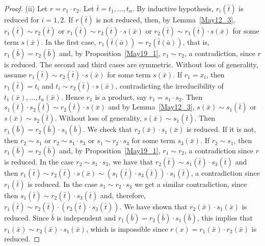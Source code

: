 \documentclass[a4paper, 11pt]{article}
\theoremstyle{note}
\begin{document}
\begin{proof}
	(ii) Let $r=r_1\cdot r_2$. Let $\bar{t}=t_1,\ldots,t_n$. By inductive hypothesis, $r_i(\bar{t})$ is reduced for $i=1,2$. If  $r(\bar{t})$ is not reduced, then,  by Lemma~\ref{May12_3}, $r_1(\bar{t})\sim r_2(\bar{t})$ or  $r_1(\bar{t})\sim r_2(\bar{t})\cdot s(\bar{x})$ or $r_2(\bar{t})\sim r_1(\bar{t})\cdot s(\bar{x})$  for some term $s(\bar{x})$. In the first case, $r_1(\bar{t}(\bar{a}))= r_2(\bar{t}(\bar{a}))$, that is, $r_1(\bar{b})= r_2(\bar{b})$ and, by Proposition~\ref{May19_1}, $r_1\sim r_2$, a contradiction, since $r$ is reduced. The second and third cases are symmetric. Without loss of generality, assume $r_1(\bar{t})\sim r_2(\bar{t})\cdot s(\bar{x})$ for some term $s(\bar{x})$. If $r_1=x_i$, then  $r_1(\bar{t})=t_i$  and $t_i\sim r_2(\bar{t})\cdot s(\bar{x})$, contradicting the irreducibility of $t_1(\bar{x}),\ldots,t_n(\bar{x})$. Hence $r_1$ is a product, say $r_1= s_1\cdot s_2$. Then $s_1(\bar{t})\cdot s_2(\bar{t})\sim r_2(\bar{t})\cdot s(\bar{x})$ and by Lemma~\ref{May12_3}, $s(\bar{x})\sim s_1(\bar{t})$ or $s(\bar{x})\sim s_2(\bar{t})$. Without loss of generality, $s(\bar{x})\sim s_1(\bar{t})$. Then $r_1(\bar{b})= r_2(\bar{b})\cdot s_1(\bar{b})$. We  check that $r_2(\bar{x})\cdot s_1(\bar{x})$ is reduced. If it is not, then $r_2\sim s_1$ or  $r_2\sim s_1\cdot s_3$ or $s_1\sim r_2\cdot s_3$ for some term $s_3(\bar{x})$. If $r_2\sim s_1$, then $r_1(\bar{b})=r_2(\bar{b})$ and, by Proposition~\ref{May19_1},  $r_1\sim r_2$, a contradiction since $r$ is reduced. In the case 
	$r_2\sim s_1\cdot s_3$, we have that $r_2(\bar{t})\sim s_1(\bar{t})\cdot s_3(\bar{t})$ and then $r_1(\bar{t})\sim r_2(\bar{t})\cdot s(\bar{x}) \sim (s_1(\bar{t})\cdot s_3(\bar{t}))\cdot s_1(\bar{t})$, a contradiction since $r_1(\bar{t})$ is reduced. In the case $s_1\sim r_2\cdot s_3$ we get a similar contradiction, since then $s_1(\bar{t})\sim r_2(\bar{t})\cdot s_3(\bar{t})$ and, therefore, $r_1(\bar{t})\sim r_2(\bar{t})\cdot (r_2(\bar{t})\cdot s_3(\bar{t}))$. We have shown that $r_2(\bar{x})\cdot s_1(\bar{x})$ is reduced. Since $\bar{b}$ is independent and $r_1(\bar{b})= r_2(\bar{b})\cdot s_1(\bar{b})$, this implies that $r_1(\bar{x})\sim r_2(\bar{x})\cdot s_1(\bar{x})$, which is impossible since $r(x)=r_1(\bar{x})\cdot r_2(\bar{x})$ is reduced.
	

\end{proof}
\end{document}
